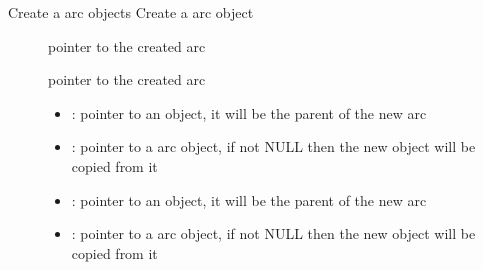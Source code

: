 \documentclass[letterpaper,10pt,english]{sphinxmanual}
\begin{document}
\begin{fulllineitems}
\label{\detokenize{object-types/arc:_CPPv413lv_arc_createP8lv_obj_tPK8lv_obj_t}}%
\pysigstartmultiline
{}\label{\detokenize{object-types/arc:lv__arc_8h_1a8e405eee0fc4d8ddb56a6fcc5209b3ba}}%
\pysigstopmultiline
Create a arc objects 
Create a arc object 
\begin{description}
\item[{}] \leavevmode
pointer to the created arc

\item[{}] \leavevmode
pointer to the created arc 

\item[{}] \leavevmode\begin{itemize}
\item {} 
: pointer to an object, it will be the parent of the new arc 

\item {} 
: pointer to a arc object, if not NULL then the new object will be copied from it 

\end{itemize}

\item[{}] \leavevmode\begin{itemize}
\item {} 
: pointer to an object, it will be the parent of the new arc 

\item {} 
: pointer to a arc object, if not NULL then the new object will be copied from it 

\end{itemize}

\end{description}


\end{fulllineitems}

\end{document}
